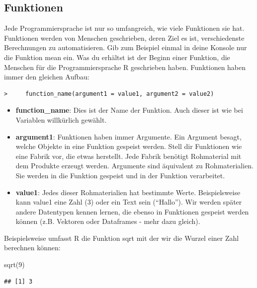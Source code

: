 \documentclass[
]{book}
\newenvironment{Shaded}{\begin{snugshade}}{\end{snugshade}}
\newcommand{\DecValTok}[1]{\textcolor[rgb]{0.00,0.00,0.81}{#1}}
\newcommand{\FunctionTok}[1]{\textcolor[rgb]{0.00,0.00,0.00}{#1}}
\newcommand{\NormalTok}[1]{#1}
\begin{document}
\hypertarget{funktionen}{%
\subsection{Funktionen}\label{funktionen}}

Jede Programmiersprache ist nur so umfangreich, wie viele Funktionen sie hat. Funktionen werden von Menschen geschrieben, deren Ziel es ist, verschiedenste Berechnungen zu automatisieren. Gib zum Beispiel einmal in deine Konsole nur die Funktion mean ein. Was du erhältst ist der Beginn einer Funktion, die Menschen für die Programmiersprache R geschrieben haben. Funktionen haben immer den gleichen Aufbau:

\begin{verbatim}
>     function_name(argument1 = value1, argument2 = value2)
\end{verbatim}

\begin{itemize}
\item
  \textbf{function\_name}: Dies ist der Name der Funktion. Auch dieser ist wie bei Variablen willkürlich gewählt.
\item
  \textbf{argument1}: Funktionen haben immer Argumente. Ein Argument besagt, welche Objekte in eine Funktion gespeist werden. Stell dir Funktionen wie eine Fabrik vor, die etwas herstellt. Jede Fabrik benötigt Rohmaterial mit dem Produkte erzeugt werden. Argumente sind äquivalent zu Rohmaterialien. Sie werden in die Funktion gespeist und in der Funktion verarbeitet.
\item
  \textbf{value1}: Jedes dieser Rohmaterialien hat bestimmte Werte. Beispielsweise kann value1 eine Zahl (3) oder ein Text sein (``Hallo''). Wir werden später andere Datentypen kennen lernen, die ebenso in Funktionen gespeist werden können (z.B. Vektoren oder Dataframes - mehr dazu gleich).
\end{itemize}

Beispielsweise umfasst R die Funktion sqrt mit der wir die Wurzel einer Zahl berechnen können:

\begin{Shaded}
\begin{Highlighting}[]
\FunctionTok{sqrt}\NormalTok{(}\DecValTok{9}\NormalTok{)}
\end{Highlighting}
\end{Shaded}

\begin{verbatim}
## [1] 3
\end{verbatim}
\end{document}
